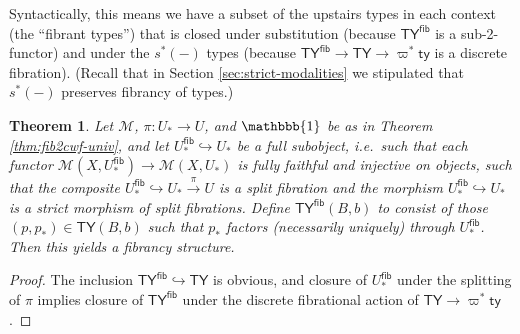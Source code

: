 \documentclass[10pt]{article}
\newtheorem{theorem}{Theorem}
\theoremstyle{definition}
\newcommand\St[2]{\ensuremath{{#1}^*(#2)}}
\newcommand\M{\mathcal{M}}
\newcommand\Mty{\mathsf{ty}}
\newcommand\Cty{\mathsf{TY}}
\newcommand\Cfibty{\mathsf{TY}^{\mathsf{fib}}}
\newcommand\vp{\varpi}
\newcommand\vpst{\vp^*}
\newcommand\one{\mathbbb{1}}
\newcommand\Un{U}
\newcommand\Ub{U_*}
\newcommand\Ubfib{\Ub^{\mathsf{fib}}}
\newcommand\pb{p_*}
\begin{document}
Syntactically, this means we have a subset of the upstairs types in each context (the ``fibrant types'') that is closed under substitution (because $\Cfibty$ is a sub-2-functor) and under the $\St{s}{-}$ types (because $\Cfibty \to \Cty \to \vpst \Mty$ is a discrete fibration).
(Recall that in Section \ref{sec:strict-modalities} we stipulated that $\St{s}{-}$ preserves fibrancy of types.)

\begin{theorem}\label{thm:2cwf-fib}
  Let $\M$, $\pi:\Ub\to\Un$, and $\one$ be as in Theorem \ref{thm:fib2cwf-univ}, and let $\Ubfib \hookrightarrow \Ub$ be a full subobject, i.e.\ such that each functor $\M(X,\Ubfib) \to \M(X,\Ub)$ is fully faithful and injective on objects, such that the composite $\Ubfib \hookrightarrow \Ub \xrightarrow{\pi}\Un$ is a split fibration and the morphism $\Ubfib \hookrightarrow \Ub$ is a strict morphism of split fibrations.
  Define $\Cfibty(B,b)$ to consist of those $(p,\pb)\in \Cty(B,b)$ such that $\pb$ factors (necessarily uniquely) through $\Ubfib$.
  Then this yields a fibrancy structure.
\end{theorem}
\begin{proof}
  The inclusion $\Cfibty\hookrightarrow \Cty$ is obvious, and closure of $\Ubfib$ under the splitting of $\pi$ implies closure of $\Cfibty$ under the discrete fibrational action of $\Cty \to \vpst\Mty$.
\end{proof}
\end{document}
